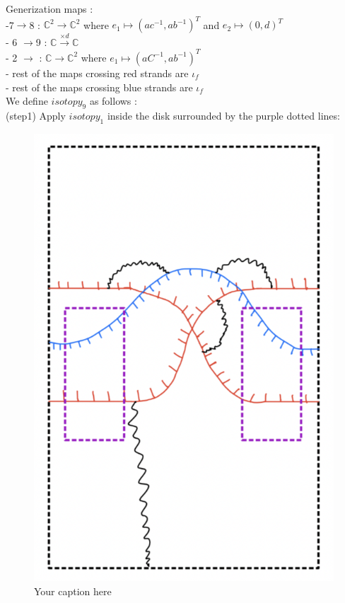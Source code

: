 Generization maps :\\
-7$\rightarrow$8 : $\mathbb{C}^2\rightarrow \mathbb{C}^2$ where $e_1 \mapsto (ac^{-1},ab^{-1})^T$ and $e_2\mapsto (0,d)^T$\\
- 6 $\rightarrow$9 : $\mathbb{C}\xrightarrow{\times d}\mathbb{C}$\\
- 2 $\rightarrow$ : $\mathbb{C}\rightarrow \mathbb{C}^2$ where $e_1 \mapsto (aC^{-1},ab^{-1})^T$\\
- rest of the maps crossing red strands are $\iota_f$\\
- rest of the maps crossing blue strands are $\iota_f$\\

We define $isotopy_9$ as follows :\\
(step1) Apply $isotopy_1$ inside the disk surrounded by the purple dotted lines:
\begin{figure}[H] %
    \centering
    \includegraphics[scale=0.95]{diagrams/lemma9/3.png} %
    \caption{Your caption here}
    \label{fig:your-label}
\end{figure}
